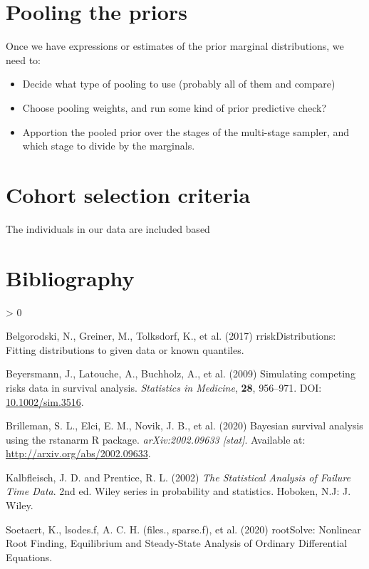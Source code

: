 \documentclass[
  10pt,
  a4paper,
]{article}
\providecommand{\tightlist}{%
  \setlength{\itemsep}{0pt}\setlength{\parskip}{0pt}}
\newlength{\cslhangindent}
\newenvironment{CSLReferences}[2] %
 {%
  \setlength{\parindent}{0pt}
  \ifodd #1 \everypar{\setlength{\hangindent}{\cslhangindent}}\ignorespaces\fi
  \ifnum #2 > 0
  \setlength{\parskip}{#2\baselineskip}
  \fi
 }%
 {}
\begin{document}
\hypertarget{pooling-the-priors}{%
\section{Pooling the priors}\label{pooling-the-priors}}

Once we have expressions or estimates of the prior marginal
distributions, we need to:

\begin{itemize}
\tightlist
\item
  Decide what type of pooling to use (probably all of them and compare)
\item
  Choose pooling weights, and run some kind of prior predictive check?
\item
  Apportion the pooled prior over the stages of the multi-stage sampler,
  and which stage to divide by the marginals.
\end{itemize}

\hypertarget{cohort-selection-criteria}{%
\section{Cohort selection criteria}\label{cohort-selection-criteria}}

The individuals in our data are included based

\hypertarget{bibliography}{%
\section{Bibliography}\label{bibliography}}

\hypertarget{refs}{}
\begin{CSLReferences}{1}{0}
\leavevmode\hypertarget{ref-belgorodski_rriskdistributions_2017}{}%
Belgorodski, N., Greiner, M., Tolksdorf, K., et al. (2017)
{rriskDistributions}: {Fitting} distributions to given data or known
quantiles.

\leavevmode\hypertarget{ref-beyersmann_simulating_2009}{}%
Beyersmann, J., Latouche, A., Buchholz, A., et al. (2009) Simulating
competing risks data in survival analysis. \emph{Statistics in
Medicine}, \textbf{28}, 956--971. DOI:
\href{https://doi.org/10.1002/sim.3516}{10.1002/sim.3516}.

\leavevmode\hypertarget{ref-brilleman_bayesian_2020}{}%
Brilleman, S. L., Elci, E. M., Novik, J. B., et al. (2020) Bayesian
survival analysis using the rstanarm {R} package. \emph{arXiv:2002.09633
{[}stat{]}}. Available at: \url{http://arxiv.org/abs/2002.09633}.

\leavevmode\hypertarget{ref-kalbfleisch_statistical_2002}{}%
Kalbfleisch, J. D. and Prentice, R. L. (2002) \emph{The Statistical
Analysis of Failure Time Data}. 2nd ed. Wiley series in probability and
statistics. {Hoboken, N.J}: {J. Wiley}.

\leavevmode\hypertarget{ref-soetaert_rootsolve_2020}{}%
Soetaert, K., lsodes.f, A. C. H. (files., sparse.f), et al. (2020)
{rootSolve}: {Nonlinear Root Finding}, {Equilibrium} and {Steady}-{State
Analysis} of {Ordinary Differential Equations}.

\end{CSLReferences}
\end{document}
